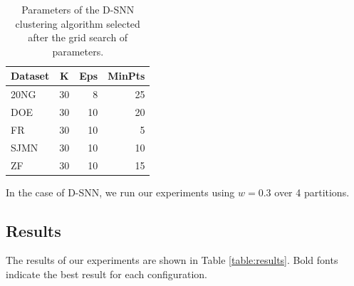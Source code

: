 \documentclass[smallextended]{svjour3}       %
\begin{document}
\begin{table}[!htbp]
\centering
\begin{tabular}{l|crr}
\textbf{Dataset} & \textbf{K} & \textbf{Eps} & \textbf{MinPts} \\ \hline
20NG    & 30& 8 & 25 \\
DOE     & 30& 10& 20 \\
FR      & 30& 10& 5  \\
SJMN    & 30& 10& 10 \\
ZF      & 30& 10& 15 \\ \hline
\end{tabular}
\caption{Parameters of the D-SNN clustering algorithm selected after the grid search of parameters.}
\label{table:distributedsnn_params}
\end{table}

In the case of D-SNN, we run our experiments using $w = 0.3$ over 4 partitions. 

\subsection*{Results} %

The results of our experiments are shown in Table \ref{table:results}. 
Bold fonts indicate the best result for each configuration. 
\end{document}

